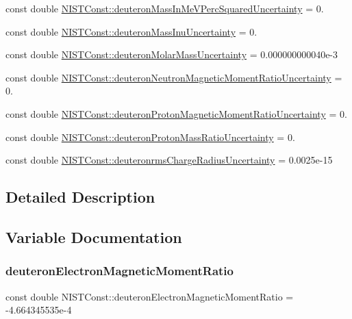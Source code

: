 \begin{DoxyCompactItemize}
\item 
const double \hyperlink{group___deuteron_ga54f9a7510840315ea70a2e80a8f17b67}{N\+I\+S\+T\+Const\+::deuteron\+Mass\+In\+Me\+V\+Perc\+Squared\+Uncertainty} = 0.
\item 
const double \hyperlink{group___deuteron_ga1d3fb0b06eb4664179fb8783ed9e6400}{N\+I\+S\+T\+Const\+::deuteron\+Mass\+Inu\+Uncertainty} = 0.
\item 
const double \hyperlink{group___deuteron_gace97511b28a700fa1a71851fb81fec9a}{N\+I\+S\+T\+Const\+::deuteron\+Molar\+Mass\+Uncertainty} = 0.\+000000000040e-\/3
\item 
const double \hyperlink{group___deuteron_gaede395611d2937f8d50bc1880ac54c7b}{N\+I\+S\+T\+Const\+::deuteron\+Neutron\+Magnetic\+Moment\+Ratio\+Uncertainty} = 0.
\item 
const double \hyperlink{group___deuteron_ga9610f6aea60f85c4026e20df7c81d185}{N\+I\+S\+T\+Const\+::deuteron\+Proton\+Magnetic\+Moment\+Ratio\+Uncertainty} = 0.
\item 
const double \hyperlink{group___deuteron_gac6ad804fc55f7b5e1424efb9cca55f7d}{N\+I\+S\+T\+Const\+::deuteron\+Proton\+Mass\+Ratio\+Uncertainty} = 0.
\item 
const double \hyperlink{group___deuteron_ga2ab958821d61f10241d90dd6736ef22c}{N\+I\+S\+T\+Const\+::deuteronrms\+Charge\+Radius\+Uncertainty} = 0.\+0025e-\/15
\end{DoxyCompactItemize}


\subsection{Detailed Description}


\subsection{Variable Documentation}
\mbox{\label{group___deuteron_gaa01fffefa3ab64430fabf08808572689}} 
\subsubsection{\texorpdfstring{deuteron\+Electron\+Magnetic\+Moment\+Ratio}{deuteronElectronMagneticMomentRatio}}
{\footnotesize\ttfamily const double N\+I\+S\+T\+Const\+::deuteron\+Electron\+Magnetic\+Moment\+Ratio = -\/4.\+664345535e-\/4}

